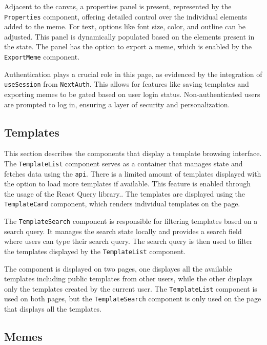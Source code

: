 Adjacent to the canvas, a properties panel is present, represented by the \texttt{Properties} component, offering detailed control over the individual elements added to the meme. For text, options like font size, color, and outline can be adjusted. This panel is dynamically populated based on the elements present in the state. The panel has the option to export a meme, which is enabled by the \texttt{ExportMeme} component.

Authentication plays a crucial role in this page, as evidenced by the integration of \texttt{useSession} from \texttt{NextAuth}. This allows for features like saving templates and exporting memes to be gated based on user login status. Non-authenticated users are prompted to log in, ensuring a layer of security and personalization.

\subsection{Templates}

This section describes the components that display a template browsing interface. The \texttt{TemplateList} component serves as a container that manages state and fetches data using the \texttt{api}. There is a limited amount of templates displayed with the option to load more templates if available. This feature is enabled through the usage of the React Query library.\cite{react-query-infinite}. The templates are displayed using the \texttt{TemplateCard} component, which renders individual templates on the page.

The \texttt{TemplateSearch} component is responsible for filtering templates based on a search query. It manages the search state locally and provides a search field where users can type their search query. The search query is then used to filter the templates displayed by the \texttt{TemplateList} component.

The component is displayed on two pages, one displayes all the available templates including public templates from other users, while the other displays only the templates created by the current user. The \texttt{TemplateList} component is used on both pages, but the \texttt{TemplateSearch} component is only used on the page that displays all the templates.

\subsection{Memes}

